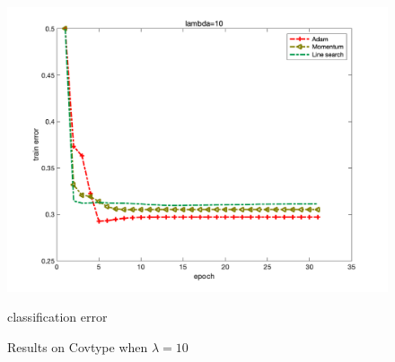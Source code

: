 \documentclass{article}
\begin{document}
\begin{figure}[H]
\begin{minipage}{0.33\linewidth}
		\includegraphics[width=1\linewidth]{./fig/err_c1}
		\caption{classification error}
	\end{minipage}
	\caption*{Results on Covtype when $\lambda=10$}
\end{figure}
\end{document}
